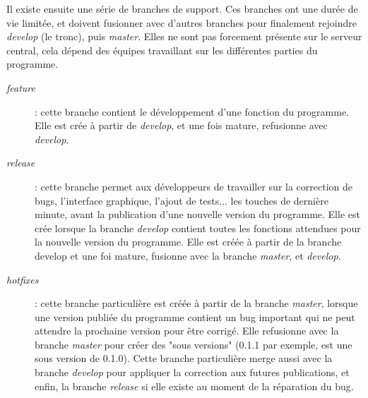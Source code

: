 Il existe ensuite une série de branches de support.
Ces branches ont une durée de vie limitée, et doivent fusionner avec d'autres branches pour finalement rejoindre \emph{develop} (le tronc), puis \emph{master}.
Elles ne sont pas forcement présente sur le serveur central, cela dépend des équipes travaillant sur les différentes parties du programme.
\begin{description}
  \item[\emph{feature}] : cette branche contient le développement d'une fonction du programme. Elle est crée à partir de \emph{develop}, et une fois mature, refusionne avec \emph{develop}.
  \item[\emph{release}] : cette branche permet aux développeurs de travailler sur la correction de bugs, l'interface graphique, l'ajout de tests... les touches de dernière minute, avant la publication d'une nouvelle version du programme. Elle est crée lorsque la branche \emph{develop} contient toutes les fonctions attendues pour la nouvelle version du programme. Elle est créée à partir de la branche develop et une foi mature, fusionne avec la branche \emph{master}, et \emph{develop}.
  \item[\emph{hotfixes}] : cette branche particulière est créée à partir de la branche \emph{master}, lorsque une version publiée du programme contient un bug important qui ne peut attendre la prochaine version pour être corrigé. Elle refusionne avec la branche \emph{master} pour créer des "sous versions" (0.1.1 par exemple, est une sous version de 0.1.0). Cette branche particulière merge aussi avec la branche \emph{develop} pour appliquer la correction aux futures publications, et enfin, la branche \emph{release} si elle existe au moment de la réparation du bug.
\end{description}

